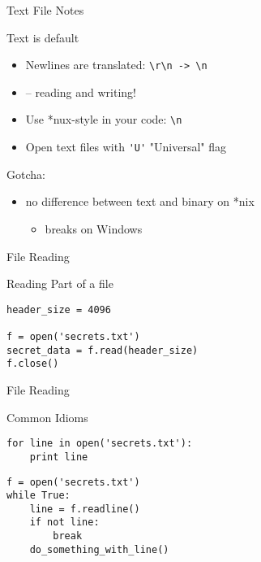 \documentclass{beamer}
\begin{document}
\begin{frame}[fragile]{Text File Notes}

{\Large Text is default}
\begin{itemize}
  \item Newlines are translated: \verb|\r\n -> \n|
  \item   -- reading and writing!
  \item Use *nux-style in your code: \verb|\n|
  \item Open text files with \verb|'U'| "Universal" flag
\end{itemize}

\vfill
{\Large Gotcha:}
\begin{itemize}
  \item  no difference between text and binary on *nix\\
  \begin{itemize}
    \item breaks on Windows
  \end{itemize}
\end{itemize}

\end{frame}

\begin{frame}[fragile]{File Reading}

{\Large Reading Part of a file}

\begin{verbatim}
header_size = 4096

f = open('secrets.txt')
secret_data = f.read(header_size)
f.close()
\end{verbatim}

\end{frame}

\begin{frame}[fragile]{File Reading}

{\Large Common Idioms}

\begin{verbatim}
for line in open('secrets.txt'):
    print line
\end{verbatim}

\begin{verbatim}
f = open('secrets.txt')
while True:
    line = f.readline()
    if not line: 
        break
    do_something_with_line()
\end{verbatim}

\end{frame}
\end{document}
